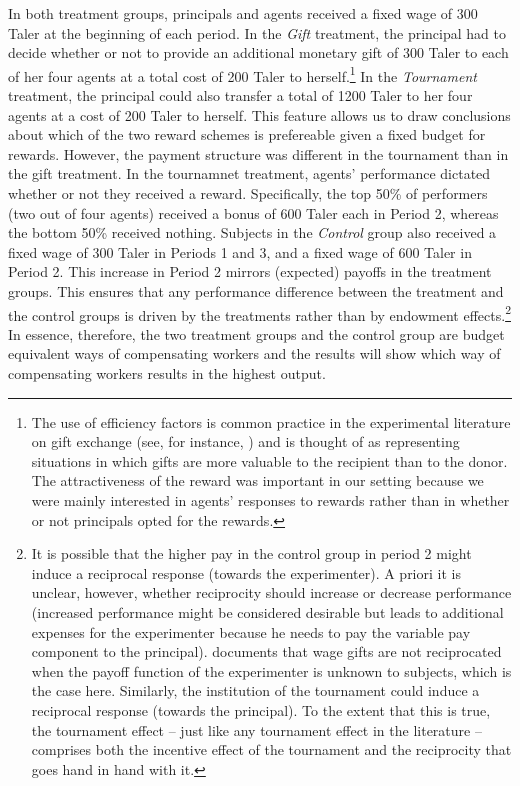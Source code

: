 In both treatment groups, principals and agents 
received a fixed wage of 300 Taler at the beginning of each period. 
In the \textit{Gift} treatment, the principal had to decide whether or not to 
provide an additional monetary gift of 300 Taler to each of her four agents at a total cost of 200 
Taler to herself.\footnote{The use of  efficiency factors is common practice 
in the experimental literature on gift exchange 
(see, for instance, \citealp{Brandts2004}) and is thought of as representing situations in which 
gifts  are more valuable to the recipient than to the donor.  
The attractiveness of the reward was important in 
our setting because we were mainly interested in agents' 
responses to rewards rather than in whether or not principals opted for the rewards.
} 
In the \textit{Tournament} treatment, the principal 
could also transfer a  total of 1200 Taler to her four agents at a  cost of 
 200 Taler to herself. This feature allows us to draw conclusions about which of the 
two reward schemes is prefereable given a fixed budget for rewards. 
However, the payment structure was different in the tournament than in the gift treatment.  
In the tournamnet treatment, agents' performance dictated whether or not they received a 
reward. Specifically, the top 50\% of performers (two out of four agents) received a 
bonus of 600 Taler each in Period 2, whereas 
the bottom 50\% received nothing.  Subjects in the \textit{Control} group also received a fixed 
wage of 300 Taler in Periods 1 and 3, and a fixed wage of 600 Taler in Period 2. This increase 
in Period 2 mirrors (expected) payoffs in the treatment groups. This ensures that any performance difference between 
the treatment and the control groups is driven by the treatments rather than by endowment effects.\footnote{It is possible
that the higher pay in the control group in period 2 might induce a reciprocal response (towards the experimenter). 
A priori it is unclear, however, whether reciprocity should increase or decrease performance (increased performance might be considered 
desirable but leads to  additional expenses for the experimenter because he needs to pay the variable pay 
component to the principal). \cite{Hennig2010} documents that wage gifts are not reciprocated when the payoff 
function of the experimenter is unknown to subjects, which is the case here. 
Similarly, the institution of the tournament could induce a reciprocal response (towards the principal).
To the extent that this is true, the  tournament effect -- just like any tournament effect in the literature -- comprises 
both the incentive effect of the tournament and the reciprocity that goes hand in hand with it. } 
In essence, therefore, the two treatment groups and the control group are budget equivalent ways of compensating workers
 and the results will show which way of compensating workers results in the highest output.

